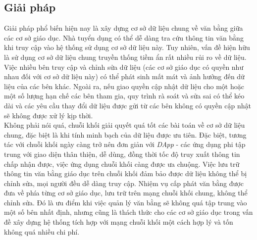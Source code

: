 \subsection{Giải pháp}

Giải pháp phổ biến hiện nay là xây dựng cơ sở dữ liệu chung về văn bằng giữa các cơ sở giáo dục. Nhà tuyển dụng có thể dễ dàng tra cứu thông tin văn bằng khi truy cập vào hệ thống sử dụng cơ sở dữ liệu này. Tuy nhiên, vấn đề hiện hữu là sử dụng cơ sở dữ liệu chung truyền thống tiềm ẩn rất nhiều rủi ro về dữ liệu. Việc nhiều bên truy cập và chỉnh sửa dữ liệu (các cơ sở giáo dục có quyền như nhau đối với cơ sở dữ liệu này) có thể phát sinh mất mát và ảnh hưởng đến dữ liệu của các bên khác. Ngoài ra, nếu giao quyền cập nhật dữ liệu cho một hoặc một số lượng hạn chế các bên tham gia, quy trình rà soát và sửa sai có thể kéo dài và các yêu cầu thay đổi dữ liệu được gửi từ các bên không có quyền cập nhật sẽ không được xử lý kịp thời.\\

Không phải nói quá, chuỗi khối giải quyết quá tốt các bài toán về cơ sở dữ liệu chung, đặc biệt là khi tính minh bạch của dữ liệu được ưu tiên. Đặc biệt, tương tác với chuỗi khối ngày càng trở nên đơn giản với \textit{DApp} - các ứng dụng phi tập trung với giao diện thân thiện, dễ dùng, đồng thời tốc độ truy xuất thông tin chấp nhận được, việc ứng dụng chuỗi khối càng được ưa chuộng. Việc lưu trữ thông tin văn bằng giáo dục trên chuỗi khối đảm bảo được dữ liệu không thể bị chỉnh sửa, mọi người đều dễ dàng truy cập. Nhiệm vụ cấp phát văn bằng được đưa về phía từng cơ sở giáo dục, lưu trữ trên mạng chuỗi khối chung, không thể chỉnh sửa. Đó là ưu điểm khi việc quản lý văn bằng sẽ không quá tập trung vào một số bên nhất định, nhưng cũng là thách thức cho các cơ sở giáo dục trong vấn đề xây dựng hệ thống tích hợp với mạng chuỗi khối một cách hợp lý và tốn không quá nhiều chi phí.
